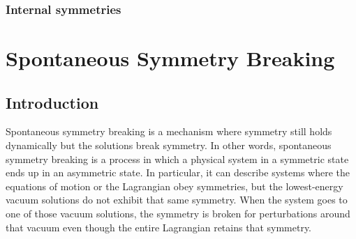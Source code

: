\documentclass[a4paper,11pt]{article}
\numberwithin{equation}{section}
\theoremstyle{definition}
\begin{document}
\subsubsection{Internal symmetries}


























\newpage


\section{Spontaneous Symmetry Breaking}
\subsection{Introduction}
Spontaneous symmetry breaking is a mechanism where symmetry still holds dynamically but the solutions break symmetry. In other words, spontaneous symmetry breaking is a process in which a physical system in a symmetric state ends up in an asymmetric state. In particular, it can describe systems where the equations of motion or the Lagrangian obey symmetries, but the lowest-energy vacuum solutions do not exhibit that same symmetry. When the system goes to one of those vacuum solutions, the symmetry is broken for perturbations around that vacuum even though the entire Lagrangian retains that symmetry.\\
\end{document}
